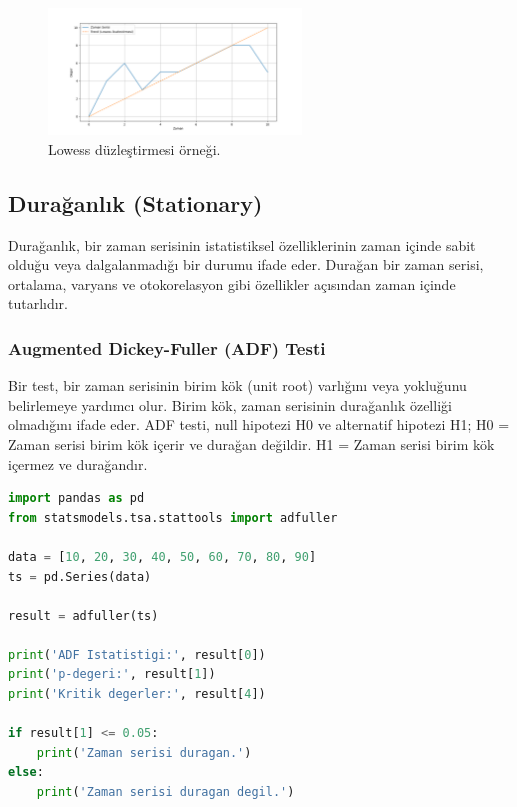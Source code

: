 \begin{figure}[h]
    \centering
    \includegraphics[width=0.6\textwidth]{images/lowess.png}
    \caption{Lowess düzleştirmesi örneği.}
    \label{fig:enter-label}
\end{figure}

\newpage

\subsection{Durağanlık (Stationary)}
Durağanlık, bir zaman serisinin istatistiksel özelliklerinin zaman içinde sabit olduğu veya dalgalanmadığı bir durumu ifade eder. Durağan bir zaman serisi, ortalama, varyans ve otokorelasyon gibi özellikler açısından zaman içinde tutarlıdır. 

\subsubsection{Augmented Dickey-Fuller (ADF) Testi}

Bir test, bir zaman serisinin birim kök (unit root) varlığını veya yokluğunu belirlemeye yardımcı olur. Birim kök, zaman serisinin durağanlık özelliği olmadığını ifade eder. ADF testi, null hipotezi H0 ve alternatif hipotezi H1; H0 = Zaman serisi birim kök içerir ve durağan değildir. H1 = Zaman serisi birim kök içermez ve durağandır.

\begin{lstlisting}[language=Python]
import pandas as pd
from statsmodels.tsa.stattools import adfuller

data = [10, 20, 30, 40, 50, 60, 70, 80, 90]
ts = pd.Series(data)

result = adfuller(ts)

print('ADF Istatistigi:', result[0])
print('p-degeri:', result[1])
print('Kritik degerler:', result[4])

if result[1] <= 0.05:
    print('Zaman serisi duragan.')
else:
    print('Zaman serisi duragan degil.')
\end{lstlisting}

\newpage

